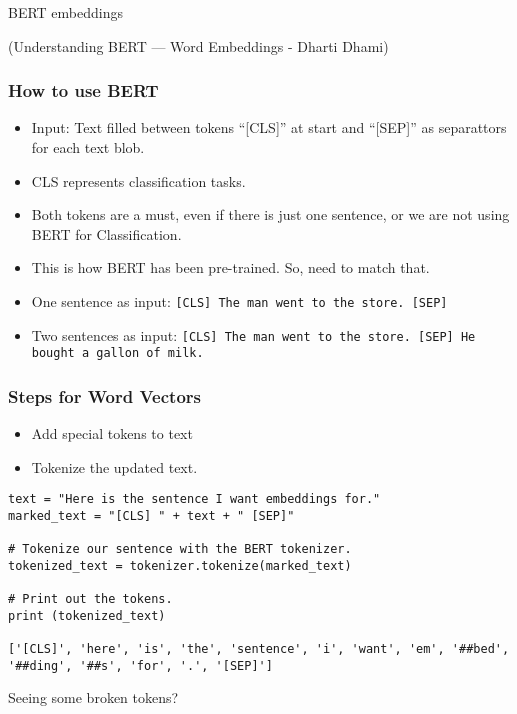 \begin{frame}[fragile]\frametitle{}

\begin{center}
{\Large BERT embeddings}

{\tiny (Understanding BERT — Word Embeddings - Dharti Dhami)}

\end{center}
\end{frame}


\begin{frame}[fragile]\frametitle{How to use BERT}
\begin{itemize}
\item Input: Text filled between tokens ``[CLS]'' at start and ``[SEP]'' as separattors for each text blob. 
\item CLS represents classification tasks. 
\item Both tokens are a must, even if there is just one sentence, or we are not using BERT for Classification.
\item This is how BERT has been pre-trained. So, need to match that.
\item One sentence as input: \lstinline|[CLS] The man went to the store. [SEP]|
\item Two sentences as input: \lstinline|[CLS] The man went to the store. [SEP] He bought a gallon of milk.|
\end{itemize}
\end{frame}

\begin{frame}[fragile]\frametitle{Steps for Word Vectors}
\begin{itemize}
\item Add special tokens to text
\item Tokenize the updated text.
\end{itemize}
\begin{lstlisting}
text = "Here is the sentence I want embeddings for."
marked_text = "[CLS] " + text + " [SEP]"

# Tokenize our sentence with the BERT tokenizer.
tokenized_text = tokenizer.tokenize(marked_text)

# Print out the tokens.
print (tokenized_text)

['[CLS]', 'here', 'is', 'the', 'sentence', 'i', 'want', 'em', '##bed', '##ding', '##s', 'for', '.', '[SEP]']
\end{lstlisting}

Seeing some broken tokens?
\end{frame}


